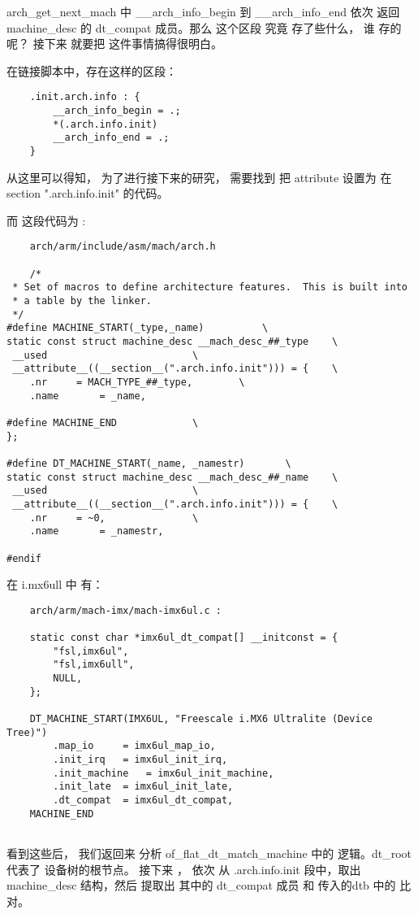 arch\_get\_next\_mach 中 \_\_arch\_info\_begin 到 \_\_arch\_info\_end 依次 返回machine\_desc 的 dt\_compat
成员。那么 这个区段 究竟 存了些什么， 谁 存的 呢？ 接下来 就要把 这件事情搞得很明白。


在链接脚本中，存在这样的区段：
\begin{lstlisting}
    .init.arch.info : {
        __arch_info_begin = .;
        *(.arch.info.init)
        __arch_info_end = .;
    }  
\end{lstlisting}

从这里可以得知， 为了进行接下来的研究， 需要找到  把 attribute 设置为 在 section ".arch.info.init" 的代码。

而 这段代码为 :
\begin{lstlisting}
    arch/arm/include/asm/mach/arch.h

    /*
 * Set of macros to define architecture features.  This is built into
 * a table by the linker.
 */
#define MACHINE_START(_type,_name)			\
static const struct machine_desc __mach_desc_##_type	\
 __used							\
 __attribute__((__section__(".arch.info.init"))) = {	\
	.nr		= MACH_TYPE_##_type,		\
	.name		= _name,

#define MACHINE_END				\
};

#define DT_MACHINE_START(_name, _namestr)		\
static const struct machine_desc __mach_desc_##_name	\
 __used							\
 __attribute__((__section__(".arch.info.init"))) = {	\
	.nr		= ~0,				\
	.name		= _namestr,

#endif

\end{lstlisting}



在 i.mx6ull 中 有：
\begin{lstlisting}
    arch/arm/mach-imx/mach-imx6ul.c :

    static const char *imx6ul_dt_compat[] __initconst = {
        "fsl,imx6ul",
        "fsl,imx6ull",
        NULL,
    };
    
    DT_MACHINE_START(IMX6UL, "Freescale i.MX6 Ultralite (Device Tree)")
        .map_io		= imx6ul_map_io,
        .init_irq	= imx6ul_init_irq,
        .init_machine	= imx6ul_init_machine,
        .init_late	= imx6ul_init_late,
        .dt_compat	= imx6ul_dt_compat,
    MACHINE_END
      
\end{lstlisting}


看到这些后， 我们返回来 分析 of\_flat\_dt\_match\_machine 中的 逻辑。dt\_root 代表了
设备树的根节点。   接下来 ， 依次 从 .arch.info.init 段中，取出 machine\_desc 结构，然后 
提取出 其中的 dt\_compat 成员 和 传入的dtb 中的 比对。 

